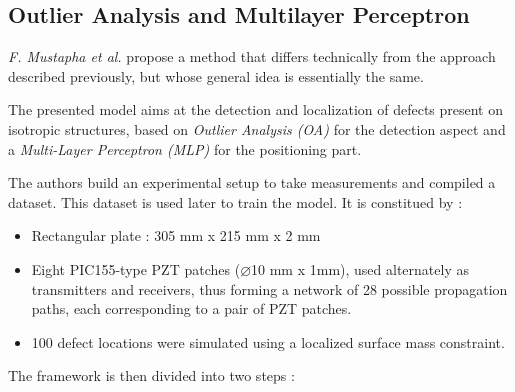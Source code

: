 \documentclass[12pt]{article}
\begin{document}
\subsection{Outlier Analysis and Multilayer Perceptron}
 
\textit{F. Mustapha et al.} \cite{MUSTAPHA20071885} propose a method that differs technically from the approach described previously, but whose general idea is essentially the same.
 
The presented model aims at the detection and localization of defects present on isotropic structures, based on \textit{Outlier Analysis (OA)} for the detection aspect and a \textit{Multi-Layer Perceptron (MLP)} for the positioning part.

The authors build an experimental setup to take measurements and compiled a dataset. This dataset is used later to train the model. It is constitued by :  

\begin{itemize}[itemsep=8pt]
    
    \item Rectangular plate : 305 mm x 215 mm x 2 mm
    \item Eight PIC155-type PZT patches ($\varnothing$10 mm x 1mm), used alternately as transmitters and receivers, thus forming a network of 28 possible propagation paths, each corresponding to a pair of PZT patches.
    \item 100 defect locations were simulated using a localized surface mass constraint.
    
\end{itemize}

The framework is then divided into two steps :
 
\end{document}
